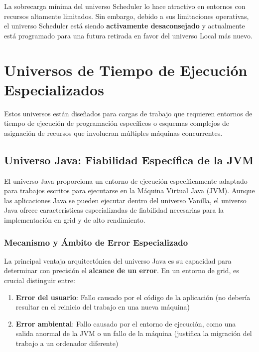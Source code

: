 La sobrecarga mínima del universo Scheduler lo hace atractivo en entornos con recursos altamente limitados. Sin embargo, debido a sus limitaciones operativas, el universo Scheduler está siendo \textbf{activamente desaconsejado} y actualmente está programado para una futura retirada en favor del universo Local más nuevo.

\section{Universos de Tiempo de Ejecución Especializados}

Estos universos están diseñados para cargas de trabajo que requieren entornos de tiempo de ejecución de programación específicos o esquemas complejos de asignación de recursos que involucran múltiples máquinas concurrentes.

\subsection{Universo Java: Fiabilidad Específica de la JVM}

El universo Java proporciona un entorno de ejecución específicamente adaptado para trabajos escritos para ejecutarse en la Máquina Virtual Java (JVM). Aunque las aplicaciones Java se pueden ejecutar dentro del universo Vanilla, el universo Java ofrece características especializadas de fiabilidad necesarias para la implementación en grid y de alto rendimiento.

\subsubsection{Mecanismo y Ámbito de Error Especializado}

La principal ventaja arquitectónica del universo Java es su capacidad para determinar con precisión el \textbf{alcance de un error}. En un entorno de grid, es crucial distinguir entre:

\begin{enumerate}
	\item \textbf{Error del usuario}: Fallo causado por el código de la aplicación (no debería resultar en el reinicio del trabajo en una nueva máquina)

	\item \textbf{Error ambiental}: Fallo causado por el entorno de ejecución, como una salida anormal de la JVM o un fallo de la máquina (justifica la migración del trabajo a un ordenador diferente)
\end{enumerate}

